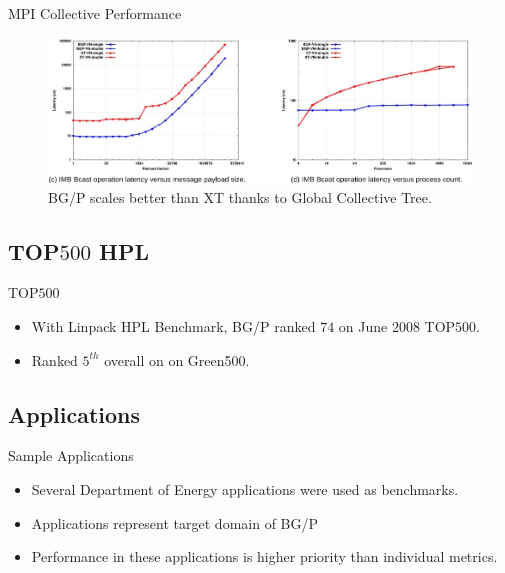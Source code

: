 \documentclass{beamer}
\begin{document}
\begin{frame}{MPI Collective Performance}
\begin{figure}
\includegraphics[scale=0.42]{figs/mpi2.png}
\caption{BG/P scales better than XT thanks to Global Collective Tree.}
\end{figure}
\end{frame}

\subsection{TOP$500$ HPL}
\begin{frame}{TOP$500$}
\begin{itemize}
\item With Linpack HPL Benchmark, BG/P ranked $74$ on June $2008$ TOP$500$.
\item Ranked $5^{th}$ overall on on Green500.
\end{itemize}
\end{frame}




\subsection{Applications}
\begin{frame}{Sample Applications}
\begin{itemize}
\item Several Department of Energy applications were used as benchmarks.
\item Applications represent target domain of BG/P
\item Performance in these applications is higher priority than individual
metrics.
\end{itemize}
\end{frame}
\end{document}
